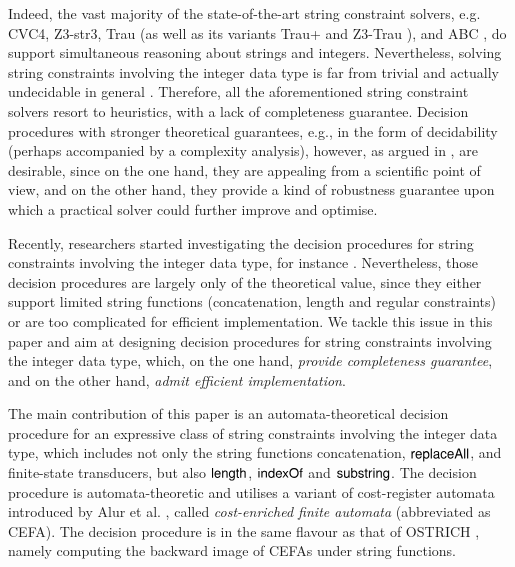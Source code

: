 Indeed, the vast majority of the state-of-the-art string constraint solvers, e.g. CVC4\cite{cvc4}, Z3-str3\cite{Z3-str3}, Trau \cite{Abdulla17} (as well as its variants Trau+ \cite{AbdullaA+19} and Z3-Trau \cite{Z3-trau}),  and ABC \cite{ABC}, do support simultaneous reasoning about strings and integers. 
Nevertheless, solving string constraints involving the integer data type is far from trivial and actually undecidable in general \cite{buchi,CCH+18}. Therefore, all the aforementioned string constraint solvers resort to heuristics, with a lack of completeness guarantee. Decision procedures with stronger theoretical guarantees, e.g., in the form of decidability (perhaps accompanied by a complexity analysis), however, as argued in \cite{CHL+19}, are desirable, since on the one hand, they are appealing from a scientific point of view, and on the other hand, they provide a kind of robustness guarantee upon which a practical solver could further improve and optimise.


Recently, researchers started investigating the decision procedures for string constraints involving the integer data type, for instance \cite{Vijay-length,L16,LinM18,LB16}. Nevertheless, those decision procedures are largely only of the theoretical value, since they either support limited string functions (concatenation, length and regular constraints) or are too complicated for efficient implementation. We tackle this issue in this paper and aim at designing decision procedures for string constraints involving the integer data type, which, on the one hand, \emph{provide completeness guarantee}, and on the other hand, \emph{admit efficient implementation}.

The main contribution of this paper is an automata-theoretical decision procedure for an expressive class of string constraints involving the integer data type, which includes not only the string functions concatenation, $\mathsf{replaceAll}$, and finite-state transducers, but also $\mathsf{length}$, $\mathsf{indexOf}$ and $\mathsf{substring}$. The decision procedure is automata-theoretic and utilises a variant of cost-register automata introduced by Alur et al. \cite{RLJ+13}, called \emph{cost-enriched finite automata} (abbreviated as CEFA). The decision procedure is in the same flavour as that of OSTRICH \cite{CHL+19}, namely computing the backward image of CEFAs under string functions. 

